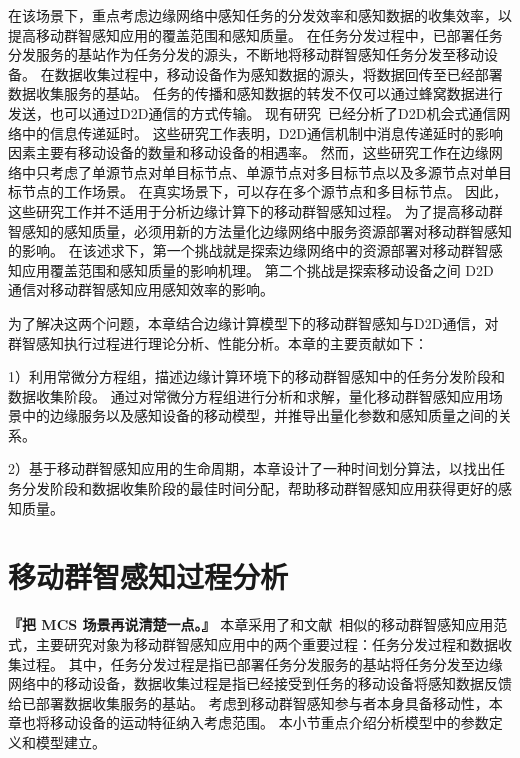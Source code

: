 在该场景下，重点考虑边缘网络中感知任务的分发效率和感知数据的收集效率，以提高移动群智感知应用的覆盖范围和感知质量。
在任务分发过程中，已部署任务分发服务的基站作为任务分发的源头，不断地将移动群智感知任务分发至移动设备。
在数据收集过程中，移动设备作为感知数据的源头，将数据回传至已经部署数据收集服务的基站。
任务的传播和感知数据的转发不仅可以通过蜂窝数据进行发送，也可以通过D2D通信的方式传输。
现有研究~\cite{DBLP:conf/wcnc/QinF13,DBLP:journals/twc/LiW14,DBLP:journals/winet/ZhaoMLT18}已经分析了D2D机会式通信网络中的信息传递延时。
这些研究工作表明，D2D通信机制中消息传递延时的影响因素主要有移动设备的数量和移动设备的相遇率。
然而，这些研究工作在边缘网络中只考虑了单源节点对单目标节点、单源节点对多目标节点以及多源节点对单目标节点的工作场景。
在真实场景下，可以存在多个源节点和多目标节点。
因此，这些研究工作并不适用于分析边缘计算下的移动群智感知过程。
为了提高移动群智感知的感知质量，必须用新的方法量化边缘网络中服务资源部署对移动群智感知的影响。
在该述求下，第一个挑战就是探索边缘网络中的资源部署对移动群智感知应用覆盖范围和感知质量的影响机理。
第二个挑战是探索移动设备之间 D2D 通信对移动群智感知应用感知效率的影响。

为了解决这两个问题，本章结合边缘计算模型下的移动群智感知与D2D通信，对群智感知执行过程进行理论分析、性能分析。本章的主要贡献如下：

1）利用常微分方程组，描述边缘计算环境下的移动群智感知中的任务分发阶段和数据收集阶段。
通过对常微分方程组进行分析和求解，量化移动群智感知应用场景中的边缘服务以及感知设备的移动模型，并推导出量化参数和感知质量之间的关系。


2）基于移动群智感知应用的生命周期，本章设计了一种时间划分算法，以找出任务分发阶段和数据收集阶段的最佳时间分配，帮助移动群智感知应用获得更好的感知质量。


\section{移动群智感知过程分析}


\textbf{『把 MCS 场景再说清楚一点。』}
本章采用了和文献~相似的移动群智感知应用范式，主要研究对象为移动群智感知应用中的两个重要过程：任务分发过程和数据收集过程。
其中，任务分发过程是指已部署任务分发服务的基站将任务分发至边缘网络中的移动设备，数据收集过程是指已经接受到任务的移动设备将感知数据反馈给已部署数据收集服务的基站。
考虑到移动群智感知参与者本身具备移动性，本章也将移动设备的运动特征纳入考虑范围。
本小节重点介绍分析模型中的参数定义和模型建立。

